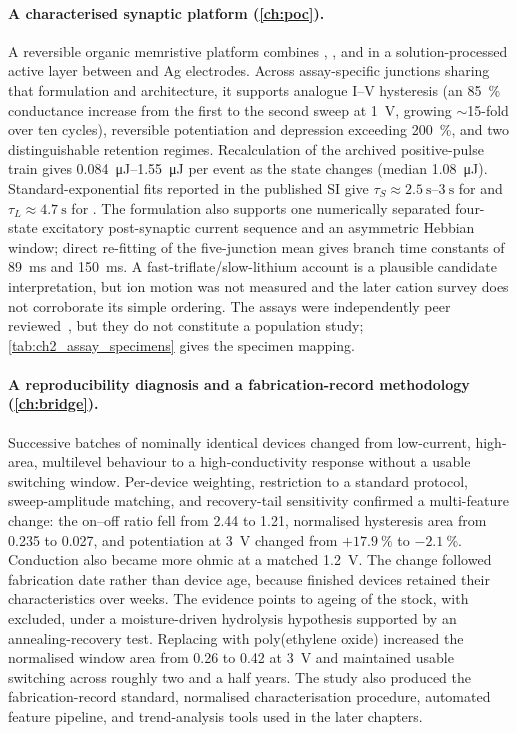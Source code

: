\documentclass[12pt, twoside]{report}
\begin{document}
\paragraph{A characterised synaptic platform (\cref{ch:poc}).} A reversible \twoterminal{} organic memristive platform combines \SY{}, \Hybrane{}, and \LiTf{} in a solution-processed active layer between \ITO{} and Ag electrodes. Across assay-specific junctions sharing that formulation and architecture, it supports analogue I--V hysteresis (an \SI{85}{\percent} conductance increase from the first to the second sweep at \SI{1}{\volt}, growing \(\sim\)\num{15}-fold over ten cycles), reversible potentiation and depression exceeding \SI{200}{\percent}, and two distinguishable retention regimes. Recalculation of the archived positive-pulse train gives \SIrange{0.084}{1.55}{\micro\joule} per event as the state changes (median \SI{1.08}{\micro\joule}). Standard-exponential fits reported in the published SI give $\tau_S\approx\SIrange{2.5}{3}{\second}$ for \STM{} and $\tau_L\approx\SI{4.7}{\second}$ for \LTM{}. The formulation also supports one numerically separated four-state excitatory post-synaptic current sequence and an asymmetric Hebbian \STDP{} window; direct re-fitting of the five-junction mean gives branch time constants of \SI{89}{\milli\second} and \SI{150}{\milli\second}. A fast-triflate/slow-lithium account is a plausible candidate interpretation, but ion motion was not measured and the later cation survey does not corroborate its simple ordering. The assays were independently peer reviewed~\cite{PradoSocorro2022}, but they do not constitute a population study; \cref{tab:ch2_assay_specimens} gives the specimen mapping.

\paragraph{A reproducibility diagnosis and a fabrication-record methodology (\cref{ch:bridge}).} Successive batches of nominally identical \Hybrane{} devices changed from low-current, high-area, multilevel behaviour to a high-conductivity response without a usable switching window. Per-device weighting, restriction to a standard protocol, sweep-amplitude matching, and recovery-tail sensitivity confirmed a multi-feature change: the on--off ratio fell from \num{2.44} to \num{1.21}, normalised hysteresis area from \num{0.235} to \num{0.027}, and potentiation at \SI{3}{\volt} changed from $+\SI{17.9}{\percent}$ to $-\SI{2.1}{\percent}$. Conduction also became more ohmic at a matched \SI{1.2}{\volt}. The change followed fabrication date rather than device age, because finished \Hybrane{} devices retained their characteristics over weeks. The evidence points to ageing of the \Hybrane{} stock, with \SY{} excluded, under a moisture-driven hydrolysis hypothesis supported by an annealing-recovery test. Replacing \Hybrane{} with poly(ethylene oxide) increased the normalised window area from \num{0.26} to \num{0.42} at \SI{3}{\volt} and maintained usable switching across roughly two and a half years. The study also produced the fabrication-record standard, normalised characterisation procedure, automated feature pipeline, and trend-analysis tools used in the later chapters.
\end{document}
